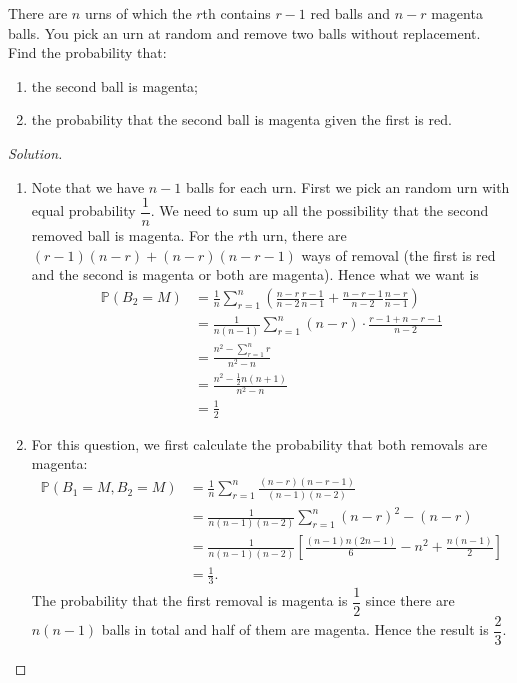 \documentclass[11pt,singlecolumn, openany, citestyle=authoryear]{elegantbook}
\begin{document}
\begin{CJK}{UTF8}{gbsn}
\begin{exercise}
    There are $n$ urns of which the $r$th contains $r-1$ red balls and $n-r$ magenta balls.
    You pick an urn at random and remove two balls without replacement. Find the probability that:
    \begin{enumerate}
        \item the second ball is magenta;
        \item the probability that the second ball is magenta given the first is red.
    \end{enumerate}
\end{exercise}
\begin{proof}[Solution]
    \begin{enumerate}
        \item 
        Note that we have $n-1$ balls for each urn.
        First we pick an random urn with equal probability $\dfrac{1}{n}$. We need to sum up 
        all the possibility that the second removed ball is magenta. For the $r$th urn, 
        there are $(r-1)(n-r)+(n-r)(n-r-1)$ ways of removal (the first is red and the second 
        is magenta or both are magenta). 
        Hence what we want is 
        $$
        \begin{aligned}
            \mathbb{P}\left(B_2=M\right) & =\frac{1}{n} \sum_{r=1}^n\left(\frac{n-r}{n-2} \frac{r-1}{n-1}+\frac{n-r-1}{n-2} \frac{n-r}{n-1}\right) \\
            & =\frac{1}{n(n-1)} \sum_{r=1}^n(n-r) \cdot \frac{r-1+n-r-1}{n-2} \\
            & =\frac{n^2-\sum_{r=1}^n r}{n^2-n} \\
            & =\frac{n^2-\frac{1}{2} n(n+1)}{n^2-n} \\
            & =\frac{1}{2}
        \end{aligned}
        $$
        \item  For this question, we first calculate the probability that both removals are 
        magenta:
        \begin{align*}
            \mathbb{P}(B_1 = M, B_2 = M) &= \frac{1}{n}\sum_{r=1}^n \frac{(n-r)(n-r-1)}{(n-1)(n-2)}\\
            &= \frac{1}{n(n-1)(n-2)}\sum_{r=1}^n (n-r)^2-(n-r)\\
            &= \frac{1}{n(n-1)(n-2)} \left[\frac{(n-1)n(2n-1)}{6}-n^2+\frac{n(n-1)}{2}\right]\\
            &= \frac{1}{3}.
        \end{align*}
        The probability that the first removal is magenta is $\dfrac{1}{2}$ since there are 
        $n(n-1)$ balls in total and half of them are magenta. 
        Hence the result is $\dfrac{2}{3}$.
    \end{enumerate}
\end{proof}


\end{CJK}
\end{document}
